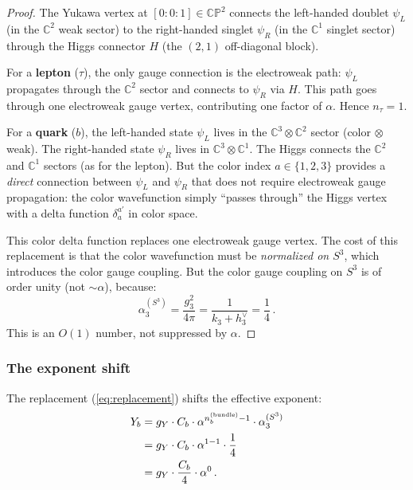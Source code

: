 \documentclass[11pt,a4paper]{article}
\newcommand{\CP}{\mathbb{CP}}
\newcommand{\C}{\mathbb{C}}
\theoremstyle{definition}
\theoremstyle{remark}
\begin{document}
\begin{proof}
The Yukawa vertex at $[0:0:1] \in \CP^2$ connects the left-handed
doublet $\psi_L$ (in the $\C^2$ weak sector) to the right-handed
singlet $\psi_R$ (in the $\C^1$ singlet sector) through the Higgs
connector $H$ (the $(2,1)$ off-diagonal block).

For a \textbf{lepton} ($\tau$), the only gauge connection is the
electroweak path: $\psi_L$ propagates through the $\C^2$ sector and
connects to $\psi_R$ via $H$.  This path goes through one electroweak
gauge vertex, contributing one factor of $\alpha$.  Hence $n_\tau = 1$.

For a \textbf{quark} ($b$), the left-handed state $\psi_L$ lives in
the $\C^3 \otimes \C^2$ sector (color $\otimes$ weak).  The
right-handed state $\psi_R$ lives in $\C^3 \otimes \C^1$.  The Higgs
connects the $\C^2$ and $\C^1$ sectors (as for the lepton).  But the
color index $a \in \{1,2,3\}$ provides a \emph{direct} connection
between $\psi_L$ and $\psi_R$ that does not require electroweak gauge
propagation: the color wavefunction simply ``passes through'' the Higgs
vertex with a delta function $\delta_a^{a'}$ in color space.

This color delta function replaces one electroweak gauge vertex.  The
cost of this replacement is that the color wavefunction must be
\emph{normalized on $S^3$}, which introduces the color gauge coupling.
But the color gauge coupling on $S^3$ is of order unity (not
$\sim \alpha$), because:
\begin{equation}\label{eq:alpha3}
\alpha_3^{(S^3)} = \frac{g_3^2}{4\pi}
= \frac{1}{k_3 + h_3^\vee} = \frac{1}{4}\,.
\end{equation}
This is an $O(1)$ number, not suppressed by $\alpha$.
\end{proof}

\subsubsection{The exponent shift}

The replacement (\ref{eq:replacement}) shifts the effective exponent:
\begin{align}
Y_b &= g_Y \cdot C_b \cdot \alpha^{n_b^{(\text{bundle})} - 1}
\cdot \alpha_3^{(S^3)} \notag\\
&= g_Y \cdot C_b \cdot \alpha^{1 - 1} \cdot \frac{1}{4} \notag\\
&= g_Y \cdot \frac{C_b}{4} \cdot \alpha^0\,.
\label{eq:yb-final}
\end{align}
\end{document}
